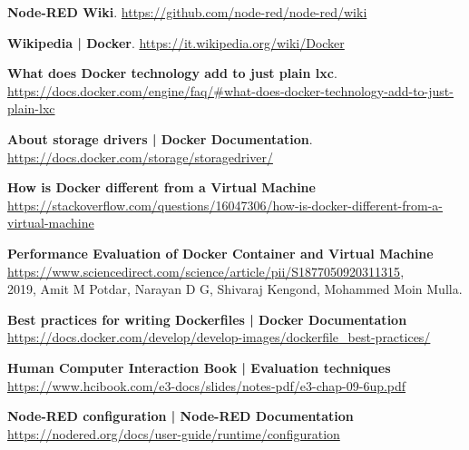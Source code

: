 \documentclass[a4paper,10pt]{memoir}
\begin{document}
\begin{thebibliography}{9}
  \textbf{Node-RED Wiki}.
  \href{https://github.com/node-red/node-red/wiki}{https://github.com/node-red/node-red/wiki}

  \textbf{Wikipedia | Docker}.
  \href{https://it.wikipedia.org/wiki/Docker/}{https://it.wikipedia.org/wiki/Docker}

  \textbf{What does Docker technology add to just plain lxc}.\\
  \href{https://docs.docker.com/engine/faq/#what-does-docker-technology-add-to-just-plain-lxc}{https://docs.docker.com/engine/faq/\#what-does-docker-technology-add-to-just-plain-lxc}

  \textbf{About storage drivers | Docker Documentation}.\\
  \href{https://docs.docker.com/storage/storagedriver/}{https://docs.docker.com/storage/storagedriver/}

    \textbf{How is Docker different from a Virtual Machine}
    \\
    \href{https://stackoverflow.com/questions/16047306/how-is-docker-different-from-a-virtual-machine}{https://stackoverflow.com/questions/16047306/how-is-docker-different-from-a-virtual-machine}

    \textbf{Performance Evaluation of Docker Container and Virtual Machine}
    \\
    \href{https://www.sciencedirect.com/science/article/pii/S1877050920311315}{https://www.sciencedirect.com/science/article/pii/S1877050920311315},
    \\
    2019, Amit M Potdar, Narayan D G, Shivaraj Kengond, Mohammed Moin Mulla.

    \textbf{Best practices for writing Dockerfiles | Docker Documentation}
    \\
    \href{https://docs.docker.com/develop/develop-images/dockerfile_best-practices/}{https://docs.docker.com/develop/develop-images/dockerfile\_best-practices/}

    \textbf{Human Computer Interaction Book | Evaluation techniques}
    \\
    \href{https://www.hcibook.com/e3-docs/slides/notes-pdf/e3-chap-09-6up.pdf}{https://www.hcibook.com/e3-docs/slides/notes-pdf/e3-chap-09-6up.pdf}
    
    \textbf{Node-RED configuration | Node-RED Documentation }
    \\
    \href{https://nodered.org/docs/user-guide/runtime/configuration}{https://nodered.org/docs/user-guide/runtime/configuration}


\end{thebibliography}
\end{document}
